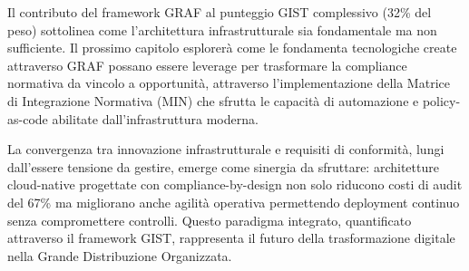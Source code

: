 Il contributo del framework GRAF al punteggio GIST complessivo (32\% del peso) sottolinea come l'architettura infrastrutturale sia fondamentale ma non sufficiente. Il prossimo capitolo esplorerà come le fondamenta tecnologiche create attraverso GRAF possano essere leverage per trasformare la compliance normativa da vincolo a opportunità, attraverso l'implementazione della Matrice di Integrazione Normativa (MIN) che sfrutta le capacità di automazione e policy-as-code abilitate dall'infrastruttura moderna.

La convergenza tra innovazione infrastrutturale e requisiti di conformità, lungi dall'essere tensione da gestire, emerge come sinergia da sfruttare: architetture cloud-native progettate con compliance-by-design non solo riducono costi di audit del 67\% ma migliorano anche agilità operativa permettendo deployment continuo senza compromettere controlli. Questo paradigma integrato, quantificato attraverso il framework GIST, rappresenta il futuro della trasformazione digitale nella Grande Distribuzione Organizzata.

\clearpage
\printbibliography[
    heading=subbibliography,
    title={Riferimenti Bibliografici del Capitolo 3},
]

